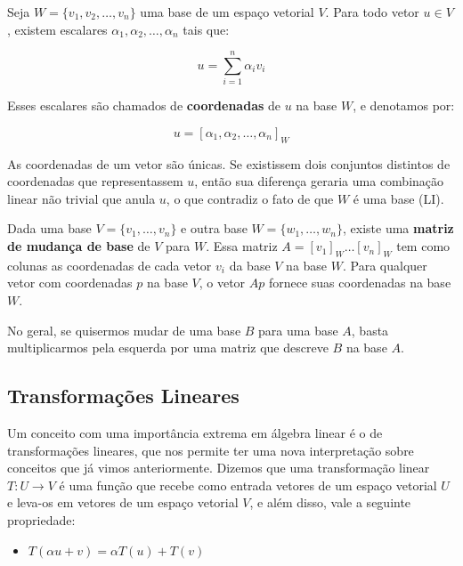\documentclass[11pt, a4paper]{article}
\begin{document}
Seja \(W = \{v_1, v_2, \ldots, v_n\}\) uma base de um espaço vetorial \(V\). Para todo vetor \(u \in V\), existem escalares \(\alpha_1, \alpha_2, \ldots, \alpha_n\) tais que:

\void[-2.1]

\[
u = \sum_{i=1}^n \alpha_i v_i
\]

\void[-0.6]

Esses escalares são chamados de \textbf{coordenadas} de $u$ na base $W$, e denotamos por:

\void[-1.2]

\[
u = [\alpha_1, \alpha_2, \ldots, \alpha_n]_W
\]

\void[-0.4]

As coordenadas de um vetor são únicas. Se existissem dois conjuntos distintos de coordenadas que representassem \(u\), então sua diferença geraria uma combinação linear não trivial que anula \(u\), o que contradiz o fato de que \(W\) é uma base (LI).

Dada uma base \(V = \{v_1, \ldots, v_n\}\) e outra base \(W = \{w_1, \ldots, w_n\}\), existe uma \textbf{matriz de mudança de base} de \(V\) para \(W\). Essa matriz \(A = [v_1]_W \ldots [v_n]_W\) tem como colunas as coordenadas de cada vetor \(v_i\) da base \(V\) na base \(W\). Para qualquer vetor com coordenadas \(p\) na base \(V\), o vetor \(Ap\) fornece suas coordenadas na base \(W\).

No geral, se quisermos mudar de uma base \(B\) para uma base \(A\), basta multiplicarmos pela esquerda por uma matriz que descreve \(B\) na base \(A\).

\void[-0.5]

\subsection{Transformações Lineares}

Um conceito com uma importância extrema em álgebra linear é o de transformações lineares, que nos permite ter uma nova interpretação sobre conceitos que já vimos anteriormente. Dizemos que uma transformação linear \(T : U\rightarrow V\) é uma função que recebe como entrada vetores de um espaço vetorial \(U\) e leva-os em vetores de um espaço vetorial \(V\), e além disso, vale a seguinte propriedade:

\begin{itemize}
    \item \(T(\alpha u+v)=\alpha T(u)+T(v)\)
\end{itemize}
\end{document}
